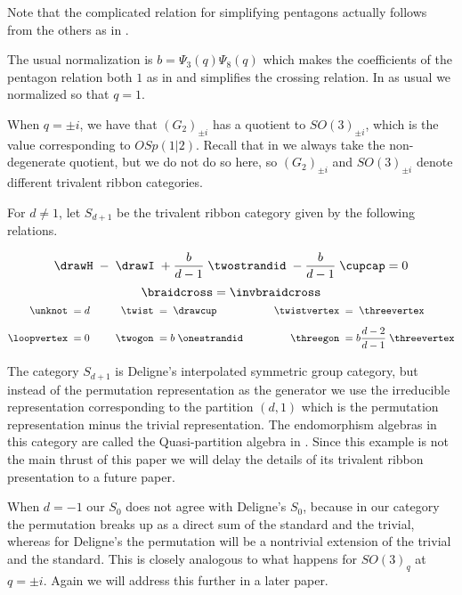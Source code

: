 \documentclass[12pt]{amsart}
\begin{document}
Note that the complicated relation for simplifying pentagons actually follows from the others as in \cite{MR3624901}.

The usual normalization is $b = \Psi_3(q) \Psi_{8}(q)$ which makes the coefficients of the pentagon relation both $1$ as in \cite{MR1403861} and simplifies the crossing relation.  In \cite{MR3624901} as usual we normalized so that $q=1$.

When $q = \pm i$, we have that $(G_2)_{\pm i}$ has a quotient to $SO(3)_{\pm i}$, which is the value corresponding to $OSp(1|2)$.  Recall that in \cite{MR3624901} we always take the non-degenerate quotient, but we do not do so here, so $(G_2)_{\pm i}$ and $SO(3)_{\pm i}$ denote different trivalent ribbon categories. 

\begin{definition}
For $d \neq 1$, let  $S_{d+1}$ be the trivalent ribbon category given by the following relations.

$$  \drawH \; - \; \drawI \; + \frac{b}{d-1}\; \twostrandid \; -  \frac{b}{d-1}\; \cupcap = 0$$
$$\braidcross  =  \invbraidcross$$
\begin{align*}
    \unknot\; &= d &\qquad
      \twist\; &=  \;\drawcup&\qquad
        \twistvertex\; &=  \;\threevertex\\[5pt]
    \loopvertex\;&=0&
      \twogon\;&= b\;\onestrandid&
        \threegon\; &= b \frac{d-2}{d-1}\;\threevertex
\end{align*}
\end{definition}

The category $S_{d+1}$ is Deligne's interpolated symmetric group category, but instead of the permutation representation as the generator we use the irreducible representation corresponding to the partition $(d,1)$ which is the permutation representation minus the trivial representation.  The endomorphism algebras in this category are called the Quasi-partition algebra in \cite{MR3177889}.  Since this example is not the main thrust of this paper we will delay the details of its trivalent ribbon presentation to a future paper.

\begin{warning}
When $d=-1$ our $S_0$ does not agree with Deligne's $S_0$, because in our category the permutation breaks up as a direct sum of the standard and the trivial, whereas for Deligne's the permutation will be a nontrivial extension of the trivial and the standard.  This is closely analogous to what happens for $SO(3)_q$ at $q=\pm i$.  Again we will address this further in a later paper.
\end{warning}
\end{document}
